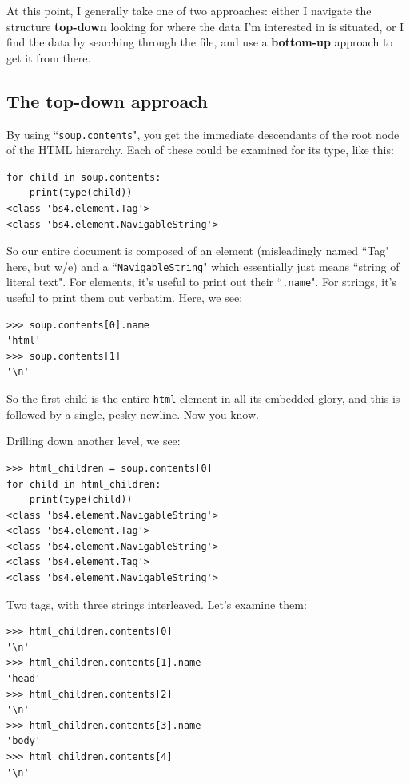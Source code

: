 \documentclass[12pt]{article}
\begin{document}
At this point, I generally take one of two approaches: either I navigate the
structure \textbf{top-down} looking for where the data I'm interested in is
situated, or I find the data by searching through the file, and use a
\textbf{bottom-up} approach to get it from there.

\subsection{The top-down approach}

By using ``\texttt{soup.contents}", you get the immediate descendants of
the root node of the HTML hierarchy. Each of these could be examined for its
type, like this:

\begin{Verbatim}[fontsize=\small,samepage=true,frame=none]
for child in soup.contents:
    print(type(child))
<class 'bs4.element.Tag'>
<class 'bs4.element.NavigableString'>
\end{Verbatim}

So our entire document is composed of an element (misleadingly named ``Tag"
here, but w/e) and a ``\texttt{NavigableString}" which essentially just means
``string of literal text". For elements, it's useful to print out their
``\texttt{.name}". For strings, it's useful to print them out verbatim. Here,
we see:

\begin{Verbatim}[fontsize=\small,samepage=true,frame=none]
>>> soup.contents[0].name
'html'
>>> soup.contents[1]
'\n'
\end{Verbatim}

So the first child is the entire \texttt{html} element in all its embedded
glory, and this is followed by a single, pesky newline. Now you know.

Drilling down another level, we see:
\begin{Verbatim}[fontsize=\small,samepage=true,frame=none]
>>> html_children = soup.contents[0]
for child in html_children:
    print(type(child))
<class 'bs4.element.NavigableString'>
<class 'bs4.element.Tag'>
<class 'bs4.element.NavigableString'>
<class 'bs4.element.Tag'>
<class 'bs4.element.NavigableString'>
\end{Verbatim}

Two tags, with three strings interleaved. Let's examine them:

\begin{Verbatim}[fontsize=\small,samepage=true,frame=none]
>>> html_children.contents[0]
'\n'
>>> html_children.contents[1].name
'head'
>>> html_children.contents[2]
'\n'
>>> html_children.contents[3].name
'body'
>>> html_children.contents[4]
'\n'
\end{Verbatim}
\end{document}
